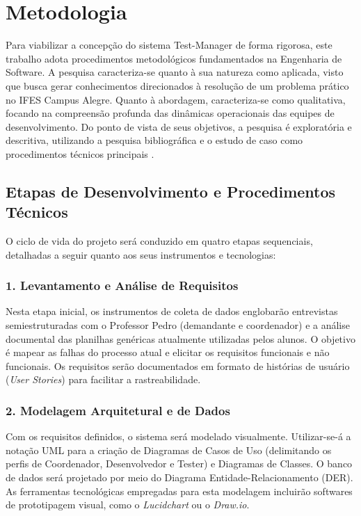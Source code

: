 \chapter{Metodologia}

Para viabilizar a concepção do sistema Test-Manager de forma rigorosa, este trabalho adota procedimentos metodológicos fundamentados na Engenharia de Software. A pesquisa caracteriza-se quanto à sua natureza como aplicada, visto que busca gerar conhecimentos direcionados à resolução de um problema prático no IFES Campus Alegre. Quanto à abordagem, caracteriza-se como qualitativa, focando na compreensão profunda das dinâmicas operacionais das equipes de desenvolvimento. Do ponto de vista de seus objetivos, a pesquisa é exploratória e descritiva, utilizando a pesquisa bibliográfica e o estudo de caso como procedimentos técnicos principais \cite{vasconcelos2006, wazlawick2019}.

\section{Etapas de Desenvolvimento e Procedimentos Técnicos}

O ciclo de vida do projeto será conduzido em quatro etapas sequenciais, detalhadas a seguir quanto aos seus instrumentos e tecnologias:

\subsection{1. Levantamento e Análise de Requisitos}
Nesta etapa inicial, os instrumentos de coleta de dados englobarão entrevistas semiestruturadas com o Professor Pedro (demandante e coordenador) e a análise documental das planilhas genéricas atualmente utilizadas pelos alunos. O objetivo é mapear as falhas do processo atual e elicitar os requisitos funcionais e não funcionais. Os requisitos serão documentados em formato de histórias de usuário (\textit{User Stories}) para facilitar a rastreabilidade.

\subsection{2. Modelagem Arquitetural e de Dados}
Com os requisitos definidos, o sistema será modelado visualmente. Utilizar-se-á a notação UML \cite{booch2005uml} para a criação de Diagramas de Casos de Uso (delimitando os perfis de Coordenador, Desenvolvedor e Tester) e Diagramas de Classes. O banco de dados será projetado por meio do Diagrama Entidade-Relacionamento (DER). As ferramentas tecnológicas empregadas para esta modelagem incluirão softwares de prototipagem visual, como o \textit{Lucidchart} ou o \textit{Draw.io}.

